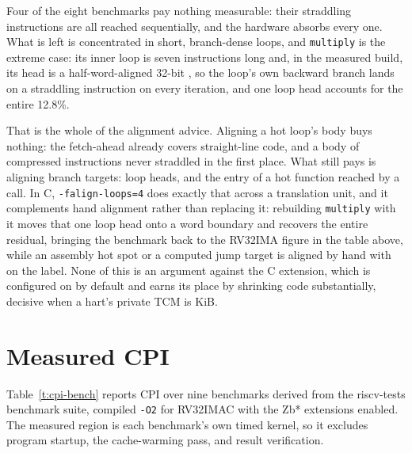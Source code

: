 \documentclass[11pt,pdftex,openany,letterpaper]{report}
\begin{document}
Four of the eight benchmarks pay nothing measurable: their straddling instructions are all reached sequentially, and the hardware absorbs every one. What is left is concentrated in short, branch-dense loops, and \texttt{multiply} is the extreme case: its inner loop is seven instructions long and, in the measured build, its head is a half-word-aligned 32-bit , so the loop's own backward branch lands on a straddling instruction on every iteration, and one loop head accounts for the entire 12.8\%.

That is the whole of the alignment advice. Aligning a hot loop's body buys nothing: the fetch-ahead already covers straight-line code, and a body of compressed instructions never straddled in the first place. What still pays is aligning branch targets: loop heads, and the entry of a hot function reached by a call. In C, \texttt{-falign-loops=4} does exactly that across a translation unit, and it complements hand alignment rather than replacing it: rebuilding \texttt{multiply} with it moves that one loop head onto a word boundary and recovers the entire residual, bringing the benchmark back to the RV32IMA figure in the table above, while an assembly hot spot or a computed jump target is aligned by hand with  on the label. None of this is an argument against the C extension, which is configured on by default and earns its place by shrinking code substantially, decisive when a hart's private TCM is \TcmSizeKiB{} KiB.

\section{Measured CPI} \label{ss:cpi-measured}

Table~\ref{t:cpi-bench} reports CPI over nine benchmarks derived from the riscv-tests benchmark suite, compiled \texttt{-O2} for RV32IMAC with the Zb* extensions enabled. The measured region is each benchmark's own timed kernel, so it excludes program startup, the cache-warming pass, and result verification.
\end{document}
